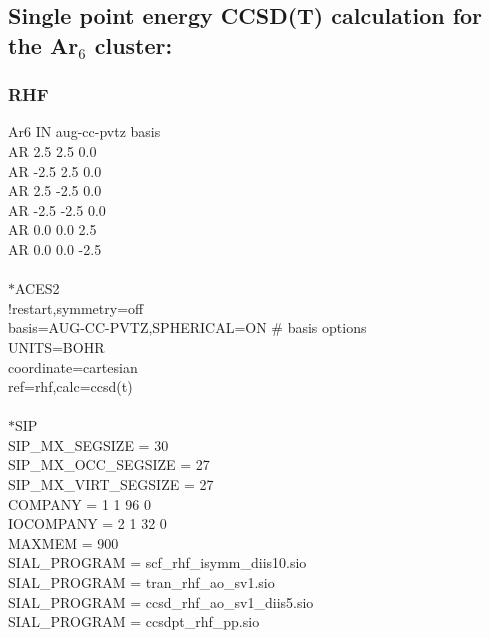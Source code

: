 \documentclass[12pt]{article}
\begin{document}
\newpage 


\noindent 
\subsection{Single point energy CCSD(T) calculation for the Ar$_6$ cluster:}
\subsubsection{RHF}
Ar6 IN aug-cc-pvtz basis\\
AR  2.5  2.5  0.0\\
AR -2.5  2.5  0.0\\
AR  2.5 -2.5  0.0\\
AR -2.5 -2.5  0.0\\
AR  0.0  0.0  2.5\\
AR  0.0  0.0 -2.5\\
\\
$*$ACES2\\
!restart,symmetry=off\\ 
basis=AUG-CC-PVTZ,SPHERICAL=ON \# basis options\\
UNITS=BOHR\\
coordinate=cartesian\\
ref=rhf,calc=ccsd(t)\\
\\
$*$SIP\\
SIP\_MX\_SEGSIZE      = 30\\
SIP\_MX\_OCC\_SEGSIZE  = 27\\
SIP\_MX\_VIRT\_SEGSIZE = 27\\ 
COMPANY   = 1 1 96 0\\
IOCOMPANY = 2 1 32 0\\
MAXMEM    = 900\\
SIAL\_PROGRAM = scf\_rhf\_isymm\_diis10.sio\\
SIAL\_PROGRAM = tran\_rhf\_ao\_sv1.sio\\
SIAL\_PROGRAM = ccsd\_rhf\_ao\_sv1\_diis5.sio\\
SIAL\_PROGRAM = ccsdpt\_rhf\_pp.sio\\


\newpage 


\noindent 
\end{document}
